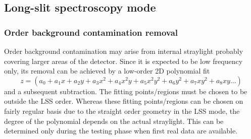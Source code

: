 \subsection{Long-slit spectroscopy mode}
\label{ssec:algo_lss_spectroscopy}

\subsubsection{Order background contamination removal}\label{ssec:orderbg}
Order background contamination may arise from internal straylight probably covering larger areas of the detector. Since it is expected to be low frequency only, its removal can be achieved by a low-order 2D polynomial fit 
\begin{equation}
    z = (a_0 + a_1x + a_2y + a_3x^2 + a_4x^2y + a_5x^2y^2 + a_6y^2 + a_7xy^2 + a_8xy ...)
\end{equation}
and a subsequent subtraction. The fitting points/regions must be chosen to be outside the \ac{LSS} order. Whereas these fitting points/regions can be chosen on fairly regular basis due to the straight order geometry in the \ac{LSS} mode, the degree of the polynomial depends on the actual straylight. This can be determined only during the testing phase when first real data are available.

